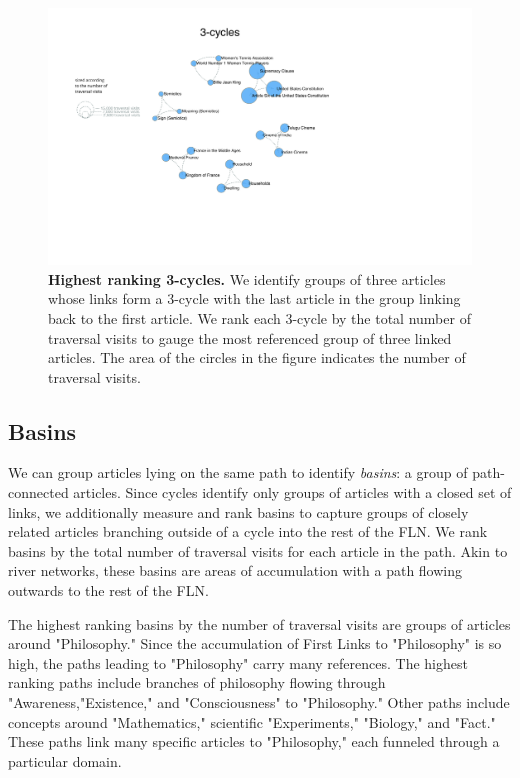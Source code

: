 \documentclass[pre,twocolumn,twoside,superscriptaddress,floatfix, aps, 10pt]{revtex4-1}
\begin{document}
\begin{figure}[tp!]
  \centering	
  \includegraphics[width=\textwidth]{graphics/3_cycles.pdf}
  \caption{
    \textbf{Highest ranking 3-cycles.}
    We identify groups of three articles whose links form a 3-cycle with the 
    last article in the group linking back to the first article.
    We rank each 3-cycle by the total number of traversal visits to gauge
    the most referenced group of three linked articles. 
    The area of the circles in the figure indicates the number of traversal visits. 
  }
  \label{fig:3-cycles}
\end{figure}






\subsection{Basins}

We can group articles lying on the same path to identify {\it basins}: 
a group of path-connected articles.
Since cycles identify only groups of articles with a closed set of links, 
we additionally measure and rank basins to capture groups of closely related
articles branching outside of a cycle into the rest of the FLN.
We rank basins by the total number of traversal visits for each article in the path. 
Akin to river networks, these basins are areas of accumulation with a path 
flowing outwards to the rest of the FLN.

The highest ranking basins by the number of traversal visits are groups of articles
around "Philosophy." 
Since the accumulation of First Links to "Philosophy" is so high, 
the paths leading to "Philosophy" carry many references.
The highest ranking paths include branches of philosophy flowing through 
"Awareness,"Existence," and "Consciousness" to "Philosophy." Other paths
include concepts around "Mathematics," scientific "Experiments," 
"Biology," and "Fact."
These paths link many specific articles to "Philosophy," each funneled through a particular domain.
\end{document}
